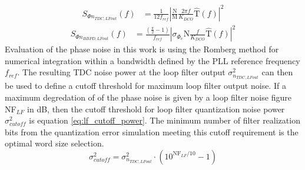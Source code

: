 \begin{align}\label{eq:tdc_noise_lf_referred}
	S_{\Phi n_{TDC,LF out}}(f) & = \frac{1}{12f_{ref}}\left|\frac{\mathrm{N}}{\mathrm{M}}\frac{2\pi f}{K_{DCO}}\hat{\mathrm{T}}(f)\right|^2
\end{align}
\begin{align}\label{eq:bbpd_noise_lf_referred}
	S_{\Phi n_{BBPD,LF out}}(f) & = \frac{\left(\frac{\pi}{2}-1\right)}{f_{ref}}\left|\sigma_{\Phi_e}\mathrm{N}\frac{f}{K_{DCO}}\hat{\mathrm{T}}(f)\right|^2
\end{align}
Evaluation of the phase noise in this work is using the Romberg method for numerical integration within a bandwidth defined by the PLL reference frequency $f_{ref}$. The resulting TDC noise power at the loop filter output $\sigma^2_{n_{TDC,LF out}}$ can then be used to define a cutoff threshold for maximum loop filter output noise. If a maximum degredation of of the phase noise is given by a loop filter noise figure NF$_{LF}$ in dB, then the cutoff threshold for loop filter quantization noise power $\sigma^2_{cutoff}$ is equation \ref{eq:lf_cutoff_power}. The minimum number of filter realization bits from the quantization error simulation meeting this cutoff requirement is the optimal word size selection.
\begin{equation}\label{eq:lf_cutoff_power}
	\sigma^2_{cutoff} = \sigma^2_{n_{TDC,LF out}}\cdot\left(10^{\text{NF}_{LF}/10}-1\right)
\end{equation}





